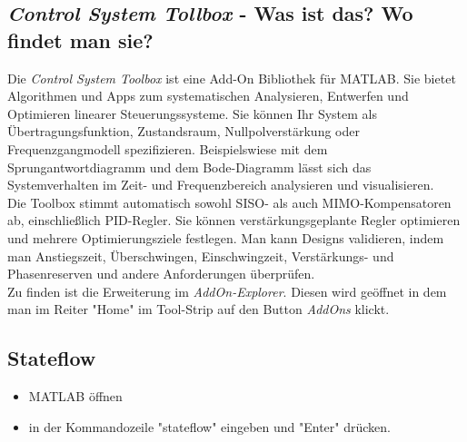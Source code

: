 \documentclass{article}
\begin{document}
		\subsection{\textit{Control System Tollbox} - Was ist das? Wo findet man sie?}
			Die \textit{Control System Toolbox} ist eine Add-On Bibliothek für MATLAB. Sie bietet Algorithmen und Apps zum systematischen Analysieren, Entwerfen und Optimieren linearer Steuerungssysteme. Sie können Ihr System als Übertragungsfunktion, Zustandsraum, Nullpolverstärkung oder Frequenzgangmodell spezifizieren. Beispielswiese mit dem Sprungantwortdiagramm und dem Bode-Diagramm lässt sich das Systemverhalten im Zeit- und Frequenzbereich analysieren und visualisieren. \\
			Die Toolbox stimmt automatisch sowohl SISO- als auch MIMO-Kompensatoren ab, einschließlich PID-Regler. Sie können verstärkungsgeplante Regler optimieren und mehrere Optimierungsziele festlegen. Man kann Designs validieren, indem man Anstiegszeit, Überschwingen, Einschwingzeit, Verstärkungs- und Phasenreserven und andere Anforderungen überprüfen. \\
			Zu finden ist die Erweiterung im \textit{AddOn-Explorer}. Diesen wird geöffnet in dem man im Reiter "Home" im Tool-Strip auf den Button \textit{AddOns} klickt.
		
		\subsection{Stateflow}
			\begin{itemize}
				\item MATLAB öffnen
				\item in der Kommandozeile "stateflow" eingeben und "Enter" drücken.
			\end{itemize}
		
		
	\newpage	
\end{document}
